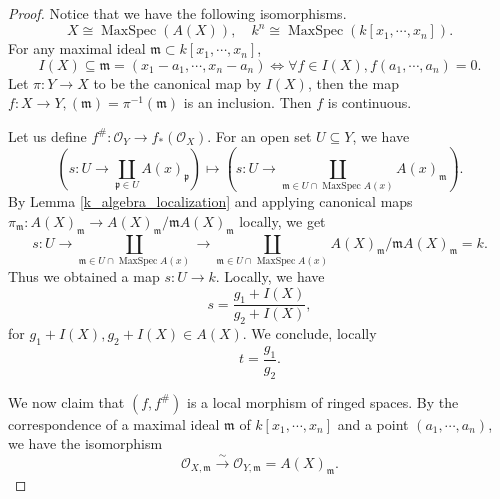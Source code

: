 \documentclass{article}
\numberwithin{equation}{section}
\DeclareMathOperator{\MaxSpec}{MaxSpec}
\newcommand*{\localization}[2]{#1_{\mathfrak{#2}}}
\newcommand*{\ringedspacemorph}[1]{(#1,#1^{\#})}
\begin{document}
\begin{proof}
Notice that we have the following isomorphisms.
\begin{equation*}
X\cong\MaxSpec(A(X)),\quad k^n\cong\MaxSpec(k[x_1,\cdots,x_n]).
\end{equation*}
For any maximal ideal $\mathfrak{m}\subset k[x_1,\cdots,x_n]$,
\begin{equation*}
I(X)\subseteq\mathfrak{m}=(x_1-a_1,\cdots,x_n-a_n)\Leftrightarrow \forall f\in I(X), f(a_1,\cdots,a_n)=0.
\end{equation*}
Let $\pi:Y\to X$ to be the canonical map by $I(X)$, then the map $f:X\to Y, (\mathfrak{m}) = \pi^{-1}(\mathfrak{m})$ is an inclusion. Then $f$ is continuous.\\%
\par Let us define $f^{\#}:\mathcal{O}_Y\to f_*(\mathcal{O}_X)$. For an open set $U\subseteq Y$, we have
\begin{equation*}
(s:U\to\coprod_{\mathfrak{p}\in U}A(x)_{\mathfrak{p}})\mapsto(s:U\to\coprod_{\mathfrak{m}\in U\cap\MaxSpec A(x)}A(x)_{\mathfrak{m}}).
\end{equation*}
By Lemma \ref{k_algebra_localization} and applying canonical maps $\pi_{\mathfrak{m}}:A(X)_{\mathfrak{m}}\to A(X)_{\mathfrak{m}}/\mathfrak{m}A(X)_{\mathfrak{m}}$ locally, we get
\begin{equation*}
s:U\to\coprod_{\mathfrak{m}\in U\cap\MaxSpec A(x)}\to\coprod_{\mathfrak{m}\in U\cap\MaxSpec A(x)}A(X)_{\mathfrak{m}}/\mathfrak{m}A(X)_{\mathfrak{m}} = k.
\end{equation*}
Thus we obtained a map $s:U\to k$. Locally, we have
\begin{equation*}
s = {\frac {g_1+I(X)} {g_2+I(X)}},
\end{equation*}
for $g_1+I(X),g_2+I(X)\in A(X)$. We conclude, locally
\begin{equation*}
t = {\frac {g_1} {g_2}}. %
\end{equation*}

We now claim that $\ringedspacemorph{f}$ is a local morphism of ringed spaces. By the correspondence of a maximal ideal $\mathfrak{m}$ of $k[x_1,\cdots,x_n]$ and a point $(a_1,\cdots,a_n)$, we have the isomorphism
\begin{equation*}
\mathcal{O}_{X,\mathfrak{m}}\stackrel{\sim}{\to}\mathcal{O}_{Y,\mathfrak{m}}=\localization{A(X)}{m}. %
\end{equation*}
\end{proof}
\end{document}
